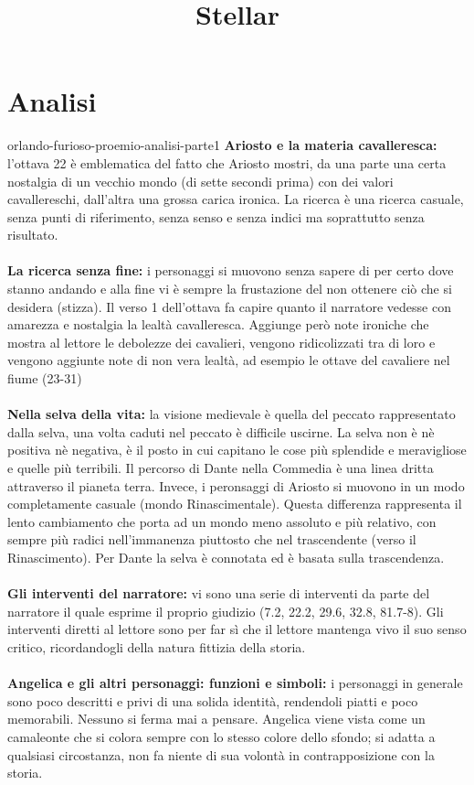 \documentclass[preview]{standalone}
\begin{document}
\title{Stellar}
\genpage

\section{Analisi}

\begin{snippet}{orlando-furioso-proemio-analisi-parte1}
    \textbf{Ariosto e la materia cavalleresca:} l'ottava 22 è emblematica del fatto che Ariosto mostri, da una parte una
    certa nostalgia di un vecchio mondo (di sette secondi prima) con dei valori cavallereschi,
    dall'altra una grossa carica ironica.
    La ricerca è una ricerca casuale, senza punti di riferimento, senza senso e senza indici
    ma soprattutto senza risultato.
    \\\\
    \textbf{La ricerca senza fine:} i personaggi si muovono senza sapere di per certo dove stanno andando
    e alla fine vi è sempre la frustazione del non ottenere ciò che si desidera (stizza).
    Il verso 1 dell'ottava  fa capire quanto il narratore
    vedesse con amarezza e nostalgia la lealtà cavalleresca.
    Aggiunge però note ironiche che mostra al lettore le debolezze dei cavalieri, vengono
    ridicolizzati tra di loro e vengono aggiunte note di non vera lealtà, ad esempio le ottave del
    cavaliere nel fiume (23-31)
    \\\\
    \textbf{Nella selva della vita:} la visione medievale è quella del peccato rappresentato dalla selva, una volta caduti
    nel peccato è difficile uscirne. La selva non è nè positiva nè negativa, è il posto
    in cui capitano le cose più splendide e meravigliose e quelle più terribili.
    Il percorso di Dante nella Commedia è una linea dritta attraverso il pianeta terra.
    Invece, i peronsaggi di Ariosto si muovono in un modo completamente casuale (mondo Rinascimentale).
    Questa differenza rappresenta il lento cambiamento che porta ad un mondo meno assoluto e più relativo,
    con sempre più radici nell'immanenza piuttosto che nel trascendente (verso il Rinascimento).
    Per Dante la selva è connotata ed è basata sulla trascendenza.
    \\\\
    \textbf{Gli interventi del narratore:} vi sono una serie di interventi da parte del narratore il quale
    esprime il proprio giudizio (7.2, 22.2, 29.6, 32.8, 81.7-8).
    Gli interventi diretti al lettore sono per far sì che il lettore mantenga vivo il suo senso critico, ricordandogli
    della natura fittizia della storia.
    \\\\
    \textbf{Angelica e gli altri personaggi: funzioni e simboli:}
    i personaggi in generale sono poco descritti e privi di una solida identità, rendendoli piatti e
    poco memorabili. Nessuno si ferma mai a pensare.
    Angelica viene vista come un camaleonte che si colora sempre con lo stesso colore dello
    sfondo; si adatta a qualsiasi circostanza, non fa niente di sua volontà in contrapposizione con
    la storia.
\end{snippet}
\end{document}
